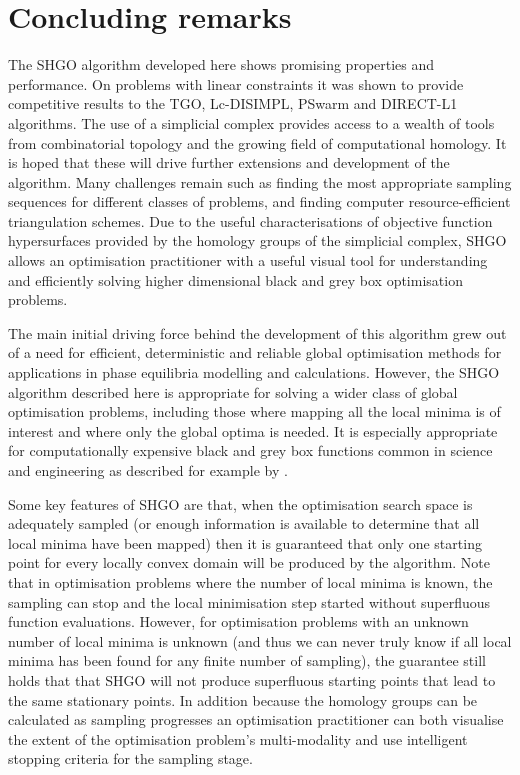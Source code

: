 \chapter{Concluding remarks}
The SHGO algorithm developed here shows promising properties and performance. On problems with linear constraints it was shown to provide competitive results to the TGO, Lc-DISIMPL, PSwarm and DIRECT-L1 algorithms. The use of a simplicial complex provides access to a wealth of tools from combinatorial topology and the growing field of computational homology. It is hoped that these will drive further extensions and development of the algorithm. Many challenges remain such as finding the most appropriate sampling sequences for different classes of problems, and finding computer resource-efficient triangulation schemes. Due to the useful characterisations of objective function hypersurfaces provided by the homology groups of the simplicial complex, SHGO allows an optimisation practitioner with a useful visual tool for understanding and efficiently solving higher dimensional black and grey box optimisation problems.

The main initial driving force behind the development of this algorithm grew out of a need for efficient, deterministic and reliable global optimisation methods for applications in phase equilibria modelling and calculations. However, the SHGO algorithm described here is appropriate for solving a wider class of global optimisation problems, including those where mapping all the local minima is of interest and where only the global optima is needed. It is especially appropriate for computationally expensive black and grey box functions common in science and engineering as described for example by \citet{Shan2010}.
 
Some key features of SHGO are that, when the optimisation search space is adequately sampled (or enough information is available to determine that all local minima have been mapped) then it is guaranteed that only one starting point for every locally convex domain will be produced by the algorithm. Note that in optimisation problems where the number of local minima is known, the sampling can stop and the local minimisation step started without superfluous function evaluations. However, for optimisation problems with an unknown number of local minima is unknown (and thus we can never truly know if all local minima has been found for any finite number of sampling), the guarantee still holds that that SHGO will not produce superfluous starting points that lead to the same stationary points. In addition because the homology groups can be calculated as sampling progresses an optimisation practitioner can both visualise the extent of the optimisation problem's multi-modality and use intelligent stopping criteria for the sampling stage.


